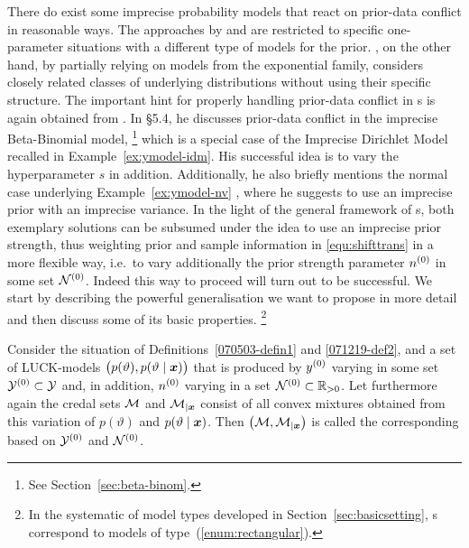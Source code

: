 There do exist some imprecise probability models that react on
prior-data conflict in reasonable ways. The approaches by
\textcite{1991:pericchi} and \textcite{1994:coolen}
are restricted to specific one-parameter situations with a different type
of models for the prior. \textcite{2005:whitcomb}, on
the other hand, by partially relying on models from the exponential
family, considers closely related classes of underlying
distributions without using their specific structure. The important
hint for properly handling prior-data conflict in
\model s is again obtained from \textcite{1991:walley}.
In \S 5.4, he discusses prior-data conflict in the imprecise
Beta-Binomial model,%
\footnote{See Section~\ref{sec:beta-binom}.}
which is a special case of the Imprecise
Dirichlet Model recalled in Example~\ref{ex:ymodel-idm}. His successful idea is to
vary the hyperparameter $s$ in addition. Additionally, he also
briefly mentions the normal case underlying Example~\ref{ex:ymodel-nv}
\parencite[\S 1.1.5 (k)]{1991:walley}, where he suggests to use an
imprecise prior with an imprecise variance. In the light of the
general framework of \model s, both exemplary solutions
can be subsumed under the idea to use an imprecise prior strength,
thus weighting prior and sample information in
\eqref{equ:shifttrans} in a more flexible way, i.e.\ to vary
additionally the prior strength parameter $n^{(0)}$ in some set $\mathcal{N}^{(0)}$.
Indeed this way to proceed will turn out to be successful.
We start by describing the powerful generalisation we want to
propose in more detail and then discuss some of its basic
properties.%
\footnote{In the systematic of model types developed in Section~\ref{sec:basicsetting},
\nymodel s correspond to models of type~(\ref{enum:rectangular}).}
%
%
%
\begin{definition}[\nymodel s]\label{071221-def}%
Consider the situation of Definitions~\ref{070503-defin1}
and \ref{071219-def2}, and a set of LUCK-models
$\big(p(\vartheta),p(\vartheta\mid{\bm x})\big)$ that is produced by
$y^{(0)}$ varying in some set $\mathcal{Y}^{(0)} \subset \mathcal{Y}$
and, in addition, $n^{(0)}$ varying in a set $\mathcal{N}^{(0)} \subset \mathbb{R}_{>0}$.
Let furthermore again the credal sets ${\cal M}$ and ${\cal M}_{|{\bm x}}$ consist
of all convex mixtures obtained from this variation of $p(\vartheta)$ and
$p(\vartheta\mid{\bm x})$. Then $\big({\cal M}, {\cal M}_{|{\bm x}}\big)$ is
called the corresponding \emph{\nymodel } based on $\mathcal{Y}^{(0)}$ and $\mathcal{N}^{(0)}$.
\end{definition}

